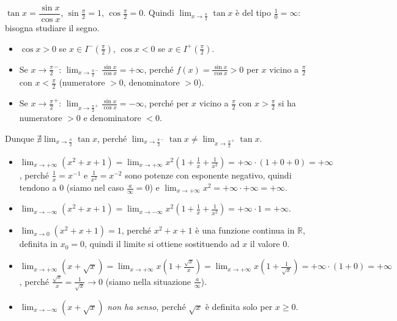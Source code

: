 \documentclass[11pt,a4paper]{article}
\begin{document}
\begin{esempio}
$\tan x = \dfrac{\sin x}{\cos x}$, $\sin\frac{\pi}{2} = 1$, $\cos\frac{\pi}{2} = 0$. Quindi $\displaystyle\lim_{x\to\frac{\pi}{2}} \tan x$ è del tipo $\frac{1}{0} = \infty$: bisogna studiare il segno.
\begin{itemize}
    \item $\cos x > 0$ se $x \in I^-(\frac{\pi}{2})$, $\cos x < 0$ se $x \in I^+(\frac{\pi}{2})$.
    \item Se $x \to \frac{\pi}{2}^-$: $\displaystyle\lim_{x\to\frac{\pi}{2}^-}\frac{\sin x}{\cos x} = +\infty$, perché $f(x) = \frac{\sin x}{\cos x} > 0$ per $x$ vicino a $\frac{\pi}{2}$ con $x < \frac{\pi}{2}$ (numeratore $>0$, denominatore $>0$).
    \item Se $x \to \frac{\pi}{2}^+$: $\displaystyle\lim_{x\to\frac{\pi}{2}^+}\frac{\sin x}{\cos x} = -\infty$, perché per $x$ vicino a $\frac{\pi}{2}$ con $x > \frac{\pi}{2}$ si ha numeratore $>0$ e denominatore $<0$.
\end{itemize}
Dunque $\displaystyle\nexists \lim_{x\to\frac{\pi}{2}}\tan x$, perché $\displaystyle\lim_{x\to\frac{\pi}{2}^-}\tan x \neq \lim_{x\to\frac{\pi}{2}^+}\tan x$.
\end{esempio}

\begin{esempio}
\begin{itemize}
    \item $\displaystyle\lim_{x\to+\infty} (x^2 + x + 1) = \lim_{x\to+\infty} x^2\left(1 + \frac{1}{x} + \frac{1}{x^2}\right) = +\infty\cdot(1 + 0 + 0) = +\infty$, perché $\frac{1}{x} = x^{-1}$ e $\frac{1}{x^2} = x^{-2}$ sono potenze con esponente negativo, quindi tendono a $0$ (siamo nel caso $\frac{a}{\infty} = 0$) e $\lim_{x\to+\infty} x^2 = +\infty\cdot+\infty = +\infty$.
    \item $\displaystyle\lim_{x\to-\infty} (x^2 + x + 1) = \lim_{x\to-\infty} x^2\left(1 + \frac{1}{x} + \frac{1}{x^2}\right) = +\infty\cdot 1 = +\infty$.
    \item $\displaystyle\lim_{x\to 0} (x^2 + x + 1) = 1$, perché $x^2 + x + 1$ è una funzione continua in $\mathbb{R}$, definita in $x_0 = 0$, quindi il limite si ottiene sostituendo ad $x$ il valore $0$.
    \item $\displaystyle\lim_{x\to+\infty} (x + \sqrt{x}) = \lim_{x\to+\infty} x\left(1 + \frac{\sqrt{x}}{x}\right) = \lim_{x\to+\infty} x\left(1 + \frac{1}{\sqrt{x}}\right) = +\infty\cdot(1 + 0) = +\infty$, perché $\frac{\sqrt x}{x} = \frac{1}{\sqrt x} \to 0$ (siamo nella situazione $\frac{a}{\infty}$).
    \item $\displaystyle\lim_{x\to-\infty} (x + \sqrt{x})$ \emph{non ha senso}, perché $\sqrt{x}$ è definita solo per $x \ge 0$.
\end{itemize}
\end{esempio}
\end{document}

